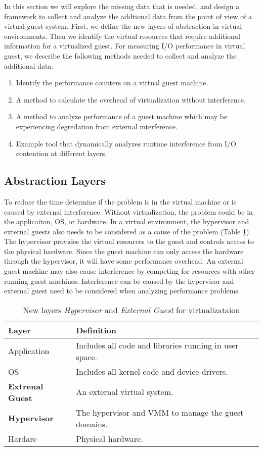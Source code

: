 In this section we will explore the missing data that is needed, and design a framework to collect and analyze the addtional data from the point of view of a virtual guest system. 
First, we define the new layers of abstraction in virtual environments.  
Then we identify the virtual resources that require additional information for a virtualized guest.
For measuring I/O performance in virtual guest, we describe the following methods needed to collect and analyze the additional data:
\begin {enumerate}
  \item Identify the performance counters on a virtual guest machine.
  \item A method to calculate the overhead of virtualization without interference.
  \item A method to analyze performance of a guest machine which may be experiencing degredation from external interference.
  \item Example tool that dynamically analyzes runtime interference from I/O contention at different layers.
\end{enumerate}

\subsection{Abstraction Layers}
To reduce the time  determine if the problem is in the virtual machine or is caused by external interference.  
Without virtualization, the problem could be in the applicaiton, OS, or hardware.  
In a virtual environment, the hypervisor and external guests also needs to be considered as a cause of the problem (Table \ref{tab:layers}).  
The hypervisor provides the virtual resources to the guest and controls access to the physical hardware.  
Since the guest machine can only access the hardware through the hypervisor, it will have some performance overhead. 
An external guest machine may also cause interference by competing for resources with other running guest machines.  
Interference can be caused by the hypervisor and external guest need to be considered when analyzing performance problems.

\begin{table}
\begin{tabular}{ l p{10cm} }
  Layer & Definition \\
  \hline
  Application & Includes all code and libraries running in user space. \\
  OS & Includes all kernel code and device drivers. \\
  \textbf{Extrenal Guest} & An external virtual system. \\
  \textbf{Hypervisor} & The hypervisor and VMM to manage the guest domains. \\
  Hardare & Physical hardware. \\
  \hline
\end{tabular}
\caption{New layers \emph{Hypervisor} and \emph{External Guest} for virtualizataion}
\label{tab:layers}
\end{table}


